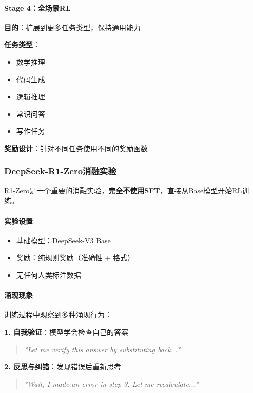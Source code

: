 \documentclass[12pt,a4paper]{article}
\begin{document}
\paragraph{Stage 4：全场景RL}

\textbf{目的}：扩展到更多任务类型，保持通用能力

\textbf{任务类型}：
\begin{itemize}
    \item 数学推理
    \item 代码生成
    \item 逻辑推理
    \item 常识问答
    \item 写作任务
\end{itemize}

\textbf{奖励设计}：针对不同任务使用不同的奖励函数

\subsubsection{DeepSeek-R1-Zero消融实验}

R1-Zero是一个重要的消融实验，\textbf{完全不使用SFT}，直接从Base模型开始RL训练。

\paragraph{实验设置}

\begin{itemize}
    \item 基础模型：DeepSeek-V3 Base
    \item 奖励：纯规则奖励（准确性 + 格式）
    \item 无任何人类标注数据
\end{itemize}

\paragraph{涌现现象}

训练过程中观察到多种涌现行为：

\textbf{1. 自我验证}：模型学会检查自己的答案
\begin{quote}
\textit{"Let me verify this answer by substituting back..."}
\end{quote}

\textbf{2. 反思与纠错}：发现错误后重新思考
\begin{quote}
\textit{"Wait, I made an error in step 3. Let me recalculate..."}
\end{quote}
\end{document}
